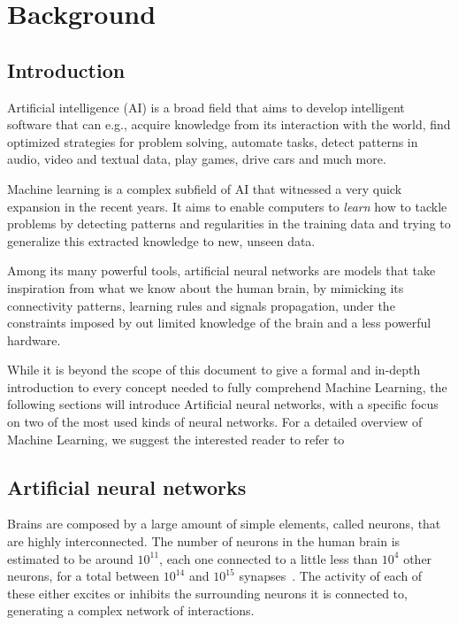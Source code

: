 \chapter{Background}

\section{Introduction}\label{sec:MLintro}
Artificial intelligence (AI) is a broad field that aims to develop intelligent
software that can e.g., acquire knowledge from its interaction with the world,
find optimized strategies for problem solving, automate tasks, detect patterns
in audio, video and textual data, play games, drive cars and much more.

Machine learning is a complex subfield of AI that witnessed a very quick
expansion in the recent years. It aims to enable computers to \emph{learn} how
to tackle problems by detecting patterns and regularities in the training data
and trying to generalize this extracted knowledge to new, unseen data.

Among its many powerful tools, artificial neural networks are models that take
inspiration from what we know about the human brain, by mimicking its
connectivity patterns, learning rules and signals propagation, under the
constraints imposed by out limited knowledge of the brain and a less powerful
hardware.

While it is beyond the scope of this document to give a formal and in-depth
introduction to every concept needed to fully comprehend Machine Learning,
the following sections will introduce Artificial neural networks, with a
specific focus on two of the most used kinds of neural networks. For a detailed
overview of Machine Learning, we suggest the interested reader to refer
to~\cite{bishop-book2006,Goodfellow-et-al-2016-Book}

\section{Artificial neural networks}\label{sec:NN}
Brains are composed by a large amount of simple elements, called neurons,
that are highly interconnected. The number of neurons in the human brain is
estimated to be around $10^{11}$, each one connected to a little less than
$10^{4}$ other neurons, for a total between $10^{14}$ and $10^{15}$
synapses~\cite{drachman2005we}. The activity of each of these either excites or
inhibits the surrounding neurons it is connected to, generating a complex
network of interactions.

